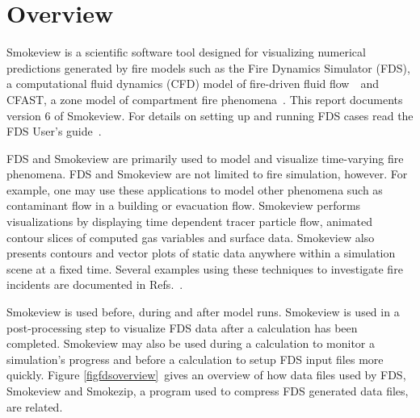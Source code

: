 \documentclass[11pt,twoside]{book}
\begin{document}
\section{Overview}
Smokeview is a scientific software tool designed for visualizing
numerical predictions generated by fire models such as the Fire
Dynamics Simulator (FDS), a computational fluid dynamics (CFD)
model of fire-driven fluid flow~\cite{FDS_Tech_Guide}\ and CFAST, a
zone model of compartment fire phenomena~\cite{CFAST_Tech_Guide_6}. This
report documents version 6 of Smokeview. For details on setting up
and running FDS cases read the FDS User's
guide~\cite{FDS_Users_Guide}.

FDS and Smokeview are primarily used to model and visualize
time-varying fire phenomena. FDS and Smokeview are not limited to
fire simulation, however. For example, one may use these
applications to model other phenomena such as contaminant flow in
a building or evacuation flow. Smokeview performs visualizations
by displaying time dependent tracer particle flow, animated
contour slices of computed gas variables and surface data.
Smokeview also presents contours and vector plots of static data
anywhere within a simulation scene at a fixed time. Several
examples using these techniques to investigate fire incidents are
documented in Refs.~\cite{CHERRYROAD,Iowa,HOUSTON,WTC}.

Smokeview is used before, during and after model runs. Smokeview
is used in a post-processing step to visualize FDS data after a
calculation has been completed. Smokeview  may also be used during
a calculation to monitor a simulation's progress and before a
calculation to setup FDS input files more quickly.  Figure
\ref{figfdsoverview}\ gives an overview of how data files used by
FDS,  Smokeview and Smokezip, a program used to compress FDS
generated data files, are related.
\end{document}
